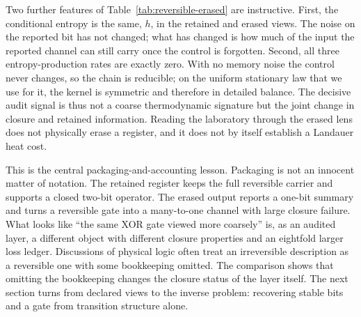 Two further features of Table~\ref{tab:reversible-erased} are instructive. First, the conditional entropy is the same, \(h\), in the retained and erased views. The noise on the reported bit has not changed; what has changed is how much of the input the reported channel can still carry once the control is forgotten. Second, all three entropy-production rates are exactly zero. With no memory noise the control never changes, so the chain is reducible; on the uniform stationary law that we use for it, the kernel is symmetric and therefore in detailed balance. The decisive audit signal is thus not a coarse thermodynamic signature but the joint change in closure and retained information. Reading the laboratory through the erased lens does not physically erase a register, and it does not by itself establish a Landauer heat cost.

This is the central packaging-and-accounting lesson. Packaging is not an innocent matter of notation. The retained register keeps the full reversible carrier and supports a closed two-bit operator. The erased output reports a one-bit summary and turns a reversible gate into a many-to-one channel with large closure failure. What looks like ``the same XOR gate viewed more coarsely'' is, as an audited layer, a different object with different closure properties and an eightfold larger loss ledger. Discussions of physical logic often treat an irreversible description as a reversible one with some bookkeeping omitted. The comparison shows that omitting the bookkeeping changes the closure status of the layer itself. The next section turns from declared views to the inverse problem: recovering stable bits and a gate from transition structure alone.
